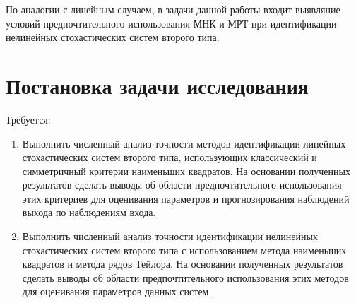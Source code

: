 По аналогии с линейным случаем, в задачи данной работы входит
выявляние условий предпочтительного использования МНК и МРТ
при идентификации нелинейных стохастических систем второго типа.

\section{Постановка задачи исследования}

Требуется:
\begin{enumerate}
\item Выполнить численный анализ точности методов идентификации
  линейных стохастических систем второго типа,
  использующих классический и симметричный критерии наименьших квадратов.
  На основании полученных результатов сделать выводы об области предпочтительного
  использования этих критериев для оценивания параметров и
  прогнозирования наблюдений выхода по наблюдениям входа.
\item Выполнить численный анализ точности идентификации
  нелинейных стохастических систем второго типа с использованием метода наименьших квадратов
  и метода рядов Тейлора.
  На основании полученных результатов сделать выводы об области предпочтительного
  использования этих методов для оценивания параметров данных систем.
\end{enumerate}
